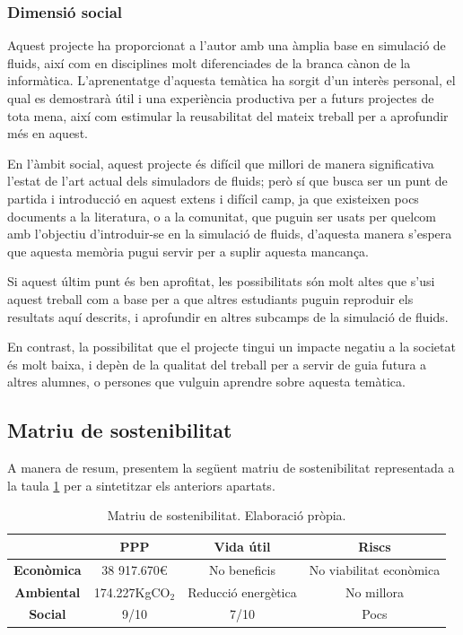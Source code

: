 \documentclass[a4paper]{report}
\begin{document}
	\subsubsection{Dimensió social}
	Aquest projecte ha proporcionat a l'autor amb una àmplia base en simulació de fluids, així com en disciplines molt diferenciades de la branca cànon de la informàtica. L'aprenentatge d'aquesta temàtica ha sorgit d'un interès personal, el qual es demostrarà útil i una experiència productiva per a futurs projectes de tota mena, així com estimular la reusabilitat del mateix treball per a aprofundir més en aquest. \par
	En l'àmbit social, aquest projecte és difícil que millori de manera significativa l'estat de l'art actual dels simuladors de fluids; però sí que busca ser un punt de partida i introducció en aquest extens i difícil camp, ja que existeixen pocs documents a la literatura, o a la comunitat, que puguin ser usats per quelcom amb l'objectiu d'introduir-se en la simulació de fluids, d'aquesta manera s'espera que aquesta memòria pugui servir per a suplir aquesta mancança. \par
	Si aquest últim punt és ben aprofitat, les possibilitats són molt altes que s'usi aquest treball com a base per a que altres estudiants puguin reproduir els resultats aquí descrits, i aprofundir en altres subcamps de la simulació de fluids. \par
	En contrast, la possibilitat que el projecte tingui un impacte negatiu a la societat és molt baixa, i depèn de la qualitat del treball per a servir de guia futura a altres alumnes, o persones que vulguin aprendre sobre aquesta temàtica.
	
	\subsection{Matriu de sostenibilitat}
	A manera de resum, presentem la següent matriu de sostenibilitat representada a la taula \ref{table:sustanMatrix} per a sintetitzar els anteriors apartats.
	
	\begin{table}[h!]
		\centering
		\hspace*{-1cm}
		\begin{tabular}{|| c || c | c | c ||}
			\hline
			& \textbf{PPP} & \textbf{Vida útil} & \textbf{Riscs} \\
			\hline \hline
			\textbf{Econòmica} & 38 917.670\euro & No beneficis & No viabilitat econòmica \\
			\hline
			\textbf{Ambiental} & 174.227KgCO$_2$ & Reducció energètica & No millora \\
			\hline
			\textbf{Social} & 9/10 & 7/10 & Pocs \\ 
			\hline
		\end{tabular}
		
		\caption[Matriu de sostenibilitat]{Matriu de sostenibilitat. Elaboració pròpia.}
		\label{table:sustanMatrix}
	\end{table}
	
	\newpage
	
	\renewcommand{\bibname}{Referències}
	
	 
	
	
	\newpage
	
	\listoffigures
	\listoftables
	
\end{document}
